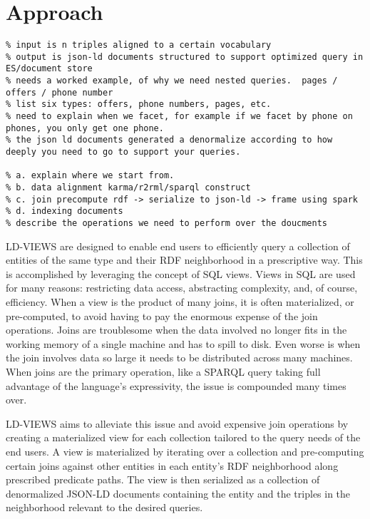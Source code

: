 \section{Approach}
\label{sec:approach}

\begin{verbatim}
% input is n triples aligned to a certain vocabulary
% output is json-ld documents structured to support optimized query in ES/document store
% needs a worked example, of why we need nested queries.  pages / offers / phone number
% list six types: offers, phone numbers, pages, etc.
% need to explain when we facet, for example if we facet by phone on phones, you only get one phone.
% the json ld documents generated a denormalize according to how deeply you need to go to support your queries.

% a. explain where we start from. 
% b. data alignment karma/r2rml/sparql construct 
% c. join precompute rdf -> serialize to json-ld -> frame using spark
% d. indexing documents
% describe the operations we need to perform over the doucments
\end{verbatim}

LD-VIEWS are designed to enable end users to efficiently query a collection of entities of the same type and their RDF neighborhood in a prescriptive way.   
This is accomplished by leveraging the concept of SQL views.  
Views in SQL are used for many reasons: restricting data access, abstracting complexity, and, of course, efficiency. 
When a view is the product of many joins, it is often materialized, or pre-computed, to avoid having to pay the enormous expense of the join operations.  
Joins are troublesome when the data involved no longer fits in the working memory of a single machine and has to spill to disk.  
Even worse is when the join involves data so large it needs to be distributed across many machines.  
When joins are the primary operation, like a SPARQL query taking full advantage of the language's expressivity, the issue is compounded many times over.         

LD-VIEWS aims to alleviate this issue and avoid expensive join operations by creating a materialized view for each collection tailored to the query needs of the end users.  A view is materialized by iterating over a collection and pre-computing certain joins against other entities in each entity's RDF neighborhood along prescribed predicate paths.  The view is then serialized as a collection of denormalized JSON-LD documents containing the entity and the triples in the neighborhood relevant to the desired queries.  

